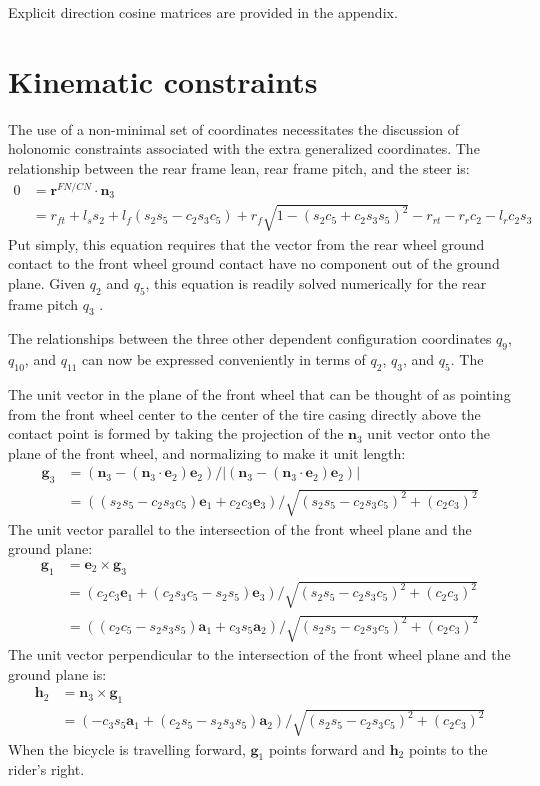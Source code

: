 \documentclass[letterpaper,11pt]{article}
\newcommand{\bs}[1]{ \boldsymbol{ #1 } }
\begin{document}
Explicit direction cosine matrices are provided in the
appendix.

\section*{Kinematic constraints}
The use of a non-minimal set of coordinates necessitates the discussion of
holonomic constraints associated with the extra generalized coordinates.  The
relationship between the rear frame lean, rear frame pitch, and the steer is:
\begin{align*}
0 & =  \bs{r}^{FN/CN} \cdot \bs{n}_3 \\
  & = r_{ft} + l_s s_2 + l_f (s_2 s_5 - c_2 s_3 c_5) +
    r_f \sqrt{1 - (s_2 c_5 + c_2 s_3 s_5)^2} - r_{rt} - r_r c_2 - l_r c_2 s_3
  \label{eq:holonomic}
\end{align*}
Put simply, this equation requires that the vector from the rear wheel ground
contact to the front wheel ground contact have no component out of the ground
plane.  Given $q_2$ and $q_5$, this equation is readily solved numerically for
the rear frame pitch $q_3$ \cite{Peterson2008a}.

The relationships between the three other dependent configuration coordinates
$q_9$, $q_{10}$, and $q_{11}$ can now be expressed conveniently in terms of
$q_2$, $q_3$, and $q_5$.  The

The unit vector in the plane of the front wheel that can be thought of as
pointing from the front wheel center to the center of the tire casing directly
above the contact point is formed by taking the projection of the $\bs{n}_3$
unit vector onto the plane of the front wheel, and normalizing to make it unit
length:
\begin{align*}
  \bs{g}_3 & = (\bs{n}_3 - (\bs{n}_3 \cdot \bs{e}_2) \bs{e}_2) / |(\bs{n}_3 -
  (\bs{n}_3 \cdot \bs{e}_2) \bs{e}_2)| \\
  & = ((s_2 s_5 - c_2 s_3 c_5) \bs{e}_1 + c_2 c_3 \bs{e}_3) / \sqrt{(s_2 s_5 -
  c_2 s_3 c_5)^2 + (c_2 c_3)^2}
\end{align*}
The unit vector parallel to the intersection of the front wheel plane and the
ground plane:
\begin{align*}
  \bs{g}_1 & = \bs{e}_2 \times \bs{g}_3 \\
  & = \left(c_2 c_3 \bs{e}_1 + (c_2 s_3 c_5 - s_2 s_5) \bs{e}_3\right) / \sqrt{(s_2 s_5 -
  c_2 s_3 c_5)^2 + (c_2 c_3)^2} \\
  & = \left((c_2 c_5 - s_2 s_3 s_5) \bs{a}_1 + c_3 s_5 \bs{a}_2\right) / \sqrt{(s_2 s_5 -
  c_2 s_3 c_5)^2 + (c_2 c_3)^2}
\end{align*}
The unit vector perpendicular to the intersection of the front wheel plane and
the ground plane is:
\begin{align*}
  \bs{h}_2 & = \bs{n}_3 \times \bs{g}_1 \\
  & = \left(-c_3 s_5 \bs{a}_1 + (c_2 s_5 - s_2 s_3 s_5) \bs{a}_2\right) / \sqrt{(s_2 s_5 -
  c_2 s_3 c_5)^2 + (c_2 c_3)^2}
\end{align*}
When the bicycle is travelling forward, $\bs{g}_1$ points forward and $\bs{h}_2$ points to
the rider's right.
\end{document}
